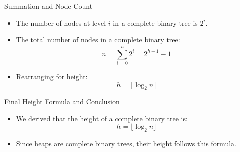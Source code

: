 \begin{frame}{Summation and Node Count}
    \begin{itemize}
        \item The number of nodes at level \( i \) in a complete binary tree is \( 2^i \).
        \item The total number of nodes in a complete binary tree:
        \begin{equation}
            n = \sum_{i=0}^{h} 2^i = 2^{h+1} - 1
        \end{equation}
        \item Rearranging for height:
        \begin{equation}
            h = \lfloor \log_2 n \rfloor
        \end{equation}
    \end{itemize}
    \centering
\end{frame}

\begin{frame}{Final Height Formula and Conclusion}
    \begin{itemize}
        \item We derived that the height of a complete binary tree is:
        \begin{equation}
            h = \lfloor \log_2 n \rfloor
        \end{equation}
        \item Since heaps are complete binary trees, their height follows this formula.
    \end{itemize}
\end{frame}

